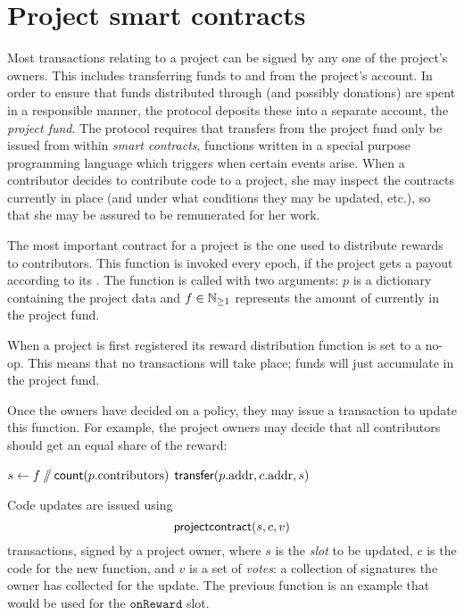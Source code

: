\section{Project smart contracts}
\label{s:smart-contracts}

Most transactions relating to a project can be signed by any one of the
project's owners. This includes transferring funds to and from the project's
account. In order to ensure that funds distributed through \osrank{} (and
possibly donations) are spent in a responsible manner, the protocol deposits
these into a separate account, the \emph{project fund}. The protocol requires
that transfers from the project fund only be issued from within \emph{smart
  contracts}, functions written in a special purpose programming language which
triggers when certain events arise. When a contributor decides to contribute
code to a project, she may inspect the contracts currently in place (and under
what conditions they may be updated, etc.), so that she may be assured to be
remunerated for her work.

The most important contract for a project is the one used to distribute rewards
to contributors. This function is invoked every epoch, if the project gets a
payout according to its \osrank{}. The function is called with two arguments:
$p$ is a dictionary containing the project data and $f \in \mathbb{N}_{\geq 1}$ represents
the amount of \oscoin{} currently in the project fund.

When a project is first registered its reward distribution function is set to a
no-op. This means that no transactions will take place; funds will just
accumulate in the project fund.

Once the owners have decided on a policy, they may issue a transaction to update
this function. For example, the project owners may decide that all contributors
should get an equal share of the reward:

\begin{algorithmic}[1]
\State $s \gets f \sslash \mathsf{count}(p.{\mathrm{contributors}})$
  \State $\mathsf{transfer}\small{\lparen p.{\mathrm{addr}}, c.{\mathrm{addr}}, s\rparen}$
\EndFor
\EndProcedure
\end{algorithmic}

Code updates are issued using
\[
    \mathsf{projectcontract}\small{\lparen s, c, v\rparen}
\]
transactions, signed by a project owner, where $s$ is the \emph{slot} to be
updated, $c$ is the code for the new function, and $v$ is a set of \emph{votes}:
a collection of signatures the owner has collected for the update. The previous
function is an example that would be used for the $\mathtt{onReward}$ slot.

